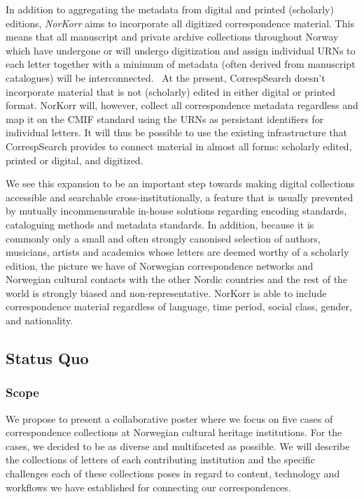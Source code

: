 \documentclass[runningheads]{llncs}
\begin{document}
In addition to aggregating the metadata from digital and printed
(scholarly) editions, \textit{NorKorr} aims to incorporate all digitized
correspondence material. This means that all manuscript and private
archive collections throughout Norway which have undergone or will
undergo digitization and assign individual URNs to each letter together
with a minimum of metadata (often derived from manuscript catalogues)
will be interconnected.~\cite{ref_proc} At the
present, CorrespSearch doesn't incorporate material that is not
(scholarly) edited in either digital or printed format. NorKorr will,
however, collect all correspondence metadata regardless and map it on
the CMIF standard using the URNs as persistant identifiers for
individual letters. It will thus be possible to use the existing
infrastructure that CorrespSearch provides to connect material in almost
all forms: scholarly edited, printed or digital, and digitized.

We see this expansion to be an important step towards making digital
collections accessible and searchable cross-institutionally, a feature
that is usually prevented by mutually incommensurable in-house
solutions regarding encoding standards, cataloguing methods and metadata
standards. In addition, because it is commonly only a small and often
strongly canonised selection of authors, musicians, artists and
academics whose letters are deemed worthy of a scholarly edition, the
picture we have of Norwegian correspondence networks and Norwegian
cultural contacts with the other Nordic countries and the rest of the
world is strongly biased and non-representative. NorKorr is able to
include correspondence material regardless of language, time period,
social class, gender, and nationality.
\subsection{Status Quo}\label{status-quo}
\subsubsection{Scope}\label{scope}
We propose to present a collaborative poster where we focus
on five cases of correspondence collections at Norwegian cultural
heritage institutions. For the cases, we decided to be as diverse and
multifaceted as possible. We will describe the collections of letters of
each contributing institution and the specific challenges each of these
collections poses in regard to content, technology and workflows we
have established for connecting our correspondences.
\end{document}
